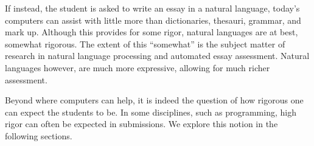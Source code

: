 If instead, the student is asked to write an essay in a natural language,
today's computers can assist with little more than dictionaries, thesauri,
grammar, and mark up. Although this provides for some rigor, natural languages
are at best, somewhat rigorous.  The extent of this ``somewhat'' is the subject
matter of research in natural language processing and automated essay
assessment\cite{valenti-et-al-2003}. Natural languages however, are much more
expressive, allowing for much richer assessment\cite{conole-warburton-2005}.

Beyond where computers can help, it is indeed the question of how rigorous one
can expect the students to be. In some disciplines, such as programming, high
rigor can often be expected in submissions. We explore this notion in the
following sections.















